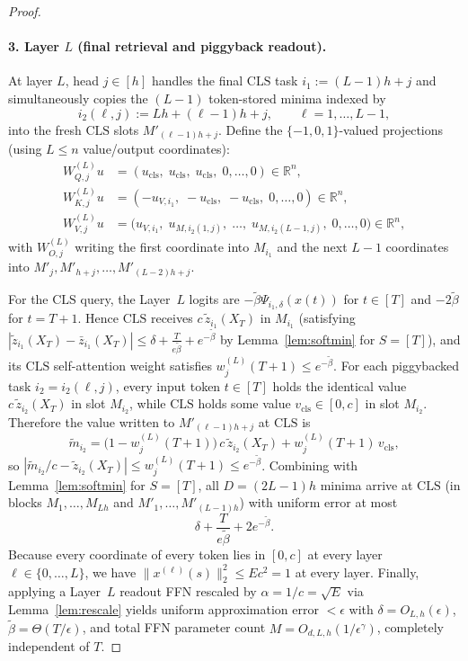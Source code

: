 \documentclass[11pt]{article}
\theoremstyle{plain}
\theoremstyle{definition}
\theoremstyle{remark}
\newcommand{\R}{\mathbb{R}}
\newcommand{\1}{\mathbf{1}}
\newcommand{\CLS}{\mathrm{CLS}}
\newcommand{\cls}{\mathrm{cls}}
\begin{document}
\begin{proof}
\paragraph{3. Layer $L$ (final retrieval and piggyback readout).}
At layer $L$, head $j \in [h]$ handles the final $\CLS$ task $i_1 := (L-1)h + j$ and simultaneously copies the $(L-1)$ token-stored minima indexed by
\[
i_2(\ell, j) := Lh + (\ell - 1)h + j, \qquad \ell = 1, \dots, L - 1,
\]
into the fresh $\CLS$ slots $M'_{(\ell - 1)h + j}$. Define the $\{-1,0,1\}$-valued projections (using $L \le n$ value/output coordinates):
\begin{align*}
W_{Q,j}^{(L)} u &= (u_{\cls},\; u_{\cls},\; u_{\cls},\; 0, \dots, 0) \in \R^n, \\
W_{K,j}^{(L)} u &= (-u_{V,i_1},\; -u_{\cls},\; -u_{\cls},\; 0, \dots, 0) \in \R^n, \\
W_{V,j}^{(L)} u &= \bigl(u_{V,i_1},\; u_{M, i_2(1,j)},\; \dots,\; u_{M, i_2(L-1,j)},\; 0, \dots, 0\bigr) \in \R^n,
\end{align*}
with $W_{O,j}^{(L)}$ writing the first coordinate into $M_{i_1}$ and the next $L-1$ coordinates into $M'_{j}, M'_{h+j}, \dots,\allowbreak M'_{(L-2)h+j}$.

For the $\CLS$ query, the Layer~$L$ logits are $-\tilde{\beta}\Psi_{i_1,\delta}(x(t))$ for $t \in [T]$ and $-2\tilde{\beta}$ for $t = T+1$. Hence $\CLS$ receives $c\,\tilde{z}_{i_1}(X_T)$ in $M_{i_1}$ (satisfying $|\tilde{z}_{i_1}(X_T) - \bar{z}_{i_1}(X_T)| \le \delta + \frac{T}{e\tilde{\beta}} + e^{-\tilde{\beta}}$ by Lemma~\ref{lem:softmin} for $S = [T]$), and its $\CLS$ self-attention weight satisfies $w^{(L)}_j(T+1) \le e^{-\tilde{\beta}}$. For each piggybacked task $i_2 = i_2(\ell, j)$, every input token $t \in [T]$ holds the identical value $c\,\tilde{z}_{i_2}(X_T)$ in slot $M_{i_2}$, while $\CLS$ holds some value $v_{\cls} \in [0,c]$ in slot $M_{i_2}$. Therefore the value written to $M'_{(\ell-1)h+j}$ at $\CLS$ is
\[
\tilde{m}_{i_2} = \bigl(1 - w^{(L)}_j(T+1)\bigr)\, c\,\tilde{z}_{i_2}(X_T) + w^{(L)}_j(T+1)\, v_{\cls},
\]
so $|\tilde{m}_{i_2}/c - \tilde{z}_{i_2}(X_T)| \le w^{(L)}_j(T+1) \le e^{-\tilde{\beta}}$. Combining with Lemma~\ref{lem:softmin} for $S = [T]$, all $D = (2L - 1)h$ minima arrive at $\CLS$ (in blocks $M_1, \dots, M_{Lh}$ and $M'_1, \dots, M'_{(L-1)h}$) with uniform error at most
\[
\delta + \frac{T}{e\tilde{\beta}} + 2e^{-\tilde{\beta}}.
\]
Because every coordinate of every token lies in $[0,c]$ at every layer $\ell \in \{0, \dots, L\}$, we have $\|x^{(\ell)}(s)\|_2^2 \le E c^2 = 1$ at every layer. Finally, applying a Layer~$L$ readout FFN rescaled by $\alpha = 1/c = \sqrt{E}$ via Lemma~\ref{lem:rescale} yields uniform approximation error $< \epsilon$ with $\delta = O_{L,h}(\epsilon)$, $\tilde{\beta} = \Theta(T/\epsilon)$, and total FFN parameter count $M = O_{d,L,h}(1/\epsilon^\gamma)$, completely independent of $T$.
\end{proof}
\end{document}
